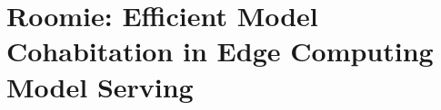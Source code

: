 \setchapterpreamble[u]{\margintoc}
\chapter{Roomie: Efficient Model Cohabitation in Edge Computing Model Serving}











